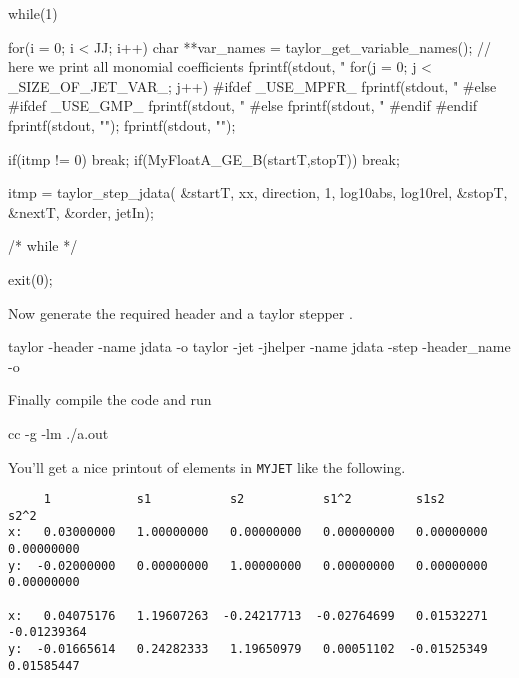 \documentclass[10pt]{article}
\theoremstyle{remark}
\newcommand{\myjet}{{\tt MY\symbol{95}JET}}
\newcommand{\inputfile}{}
\newcommand{\mainfile}{}
\newcommand{\odecfile}{}
\newcommand{\odehfile}{}
\begin{document}
\begin{code}[title={File: \mainfile{}}]
{    	 while(1)  {
    	   for(i = 0; i < JJ; i++) {
    	     char **var_names = taylor_get_variable_names();
    	     // here we print all monomial coefficients	   	     
    	     fprintf(stdout, "%
    	     for(j = 0; j < _SIZE_OF_JET_VAR_; j++) {
    #ifdef _USE_MPFR_	 	       
    	       fprintf(stdout, "%
    #else
    #ifdef _USE_GMP_
    	       fprintf(stdout, "%
    #else
    	       fprintf(stdout, "%
    #endif
    #endif	       
    	     }
    	     fprintf(stdout, "\n");	     
    	   }
    	   fprintf(stdout, "\n");	     	   
    	   
    	   if(itmp != 0) {break;} 
    	   if(MyFloatA_GE_B(startT,stopT)) { break;}
    	   
    	   itmp = taylor_step_jdata( &startT, xx, direction, 1, 
    	                             log10abs, log10rel, 
    	                             &stopT, &nextT, &order, jetIn);
    
    	 }  /* while */
    	 
    	 exit(0); 
     }   
\end{code}
Now generate the required header \odehfile{} and a taylor stepper \odecfile{}.
\begin{command}
   taylor -header -name jdata -o \odehfile{} \inputfile{} 
   taylor -jet -jhelper -name jdata -step -header_name \odehfile{} \inputfile{} -o \odecfile{}
\end{command}
Finally compile the code and run
\begin{command}
    cc -g \odecfile{} \mainfile{} -lm
    ./a.out
\end{command}
You'll get a nice printout of elements in \myjet{} like the following.
\begin{verbatim}
     1            s1           s2           s1^2         s1s2         s2^2         
x:   0.03000000   1.00000000   0.00000000   0.00000000   0.00000000   0.00000000 
y:  -0.02000000   0.00000000   1.00000000   0.00000000   0.00000000   0.00000000 

x:   0.04075176   1.19607263  -0.24217713  -0.02764699   0.01532271  -0.01239364 
y:  -0.01665614   0.24282333   1.19650979   0.00051102  -0.01525349   0.01585447 
\end{verbatim}
\end{document}
